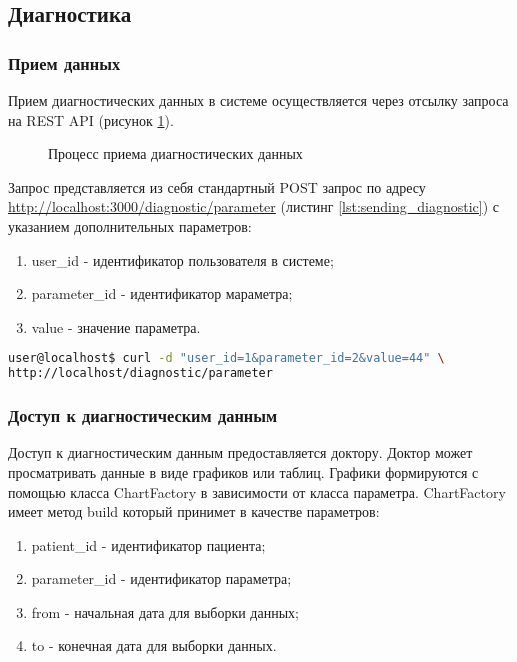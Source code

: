 \newpage
\subsection{Диагностика}
\subsubsection{Прием данных}
Прием диагностических данных в системе осуществляется через отсылку запроса на
REST API (рисунок \ref{ris:diagnostic_post_request}).

\begin{figure}[h]
\caption{Процесс приема диагностических данных}
\label{ris:diagnostic_post_request}


\end{figure}

Запрос представляется из себя стандартный POST запрос по адресу
\url{http://localhost:3000/diagnostic/parameter} (листинг
\ref{lst:sending_diagnostic}) с указанием дополнительных параметров:
\begin{enumerate}
  \item user\_id - идентификатор пользователя в системе;
  \item parameter\_id - идентификатор мараметра;
  \item value - значение параметра.   
\end{enumerate}

\begin{lstlisting}[language=Bash,caption=Отправка диагностических данных
,label={lst:sending_diagnostic}] 
user@localhost$ curl -d "user_id=1&parameter_id=2&value=44" \
http://localhost/diagnostic/parameter
\end{lstlisting}

\subsubsection{Доступ к диагностическим данным}
Доступ к диагностическим данным предоставляется доктору. Доктор может
просматривать данные в виде графиков или таблиц. Графики формируются с помощью
класса ChartFactory в зависимости от класса параметра. ChartFactory имеет метод
build который принимет в качестве параметров:
\begin{enumerate}
  \item patient\_id - идентификатор пациента;
  \item parameter\_id - идентификатор параметра;
  \item from - начальная дата для выборки данных;
  \item to - конечная дата для выборки данных.
\end{enumerate}

